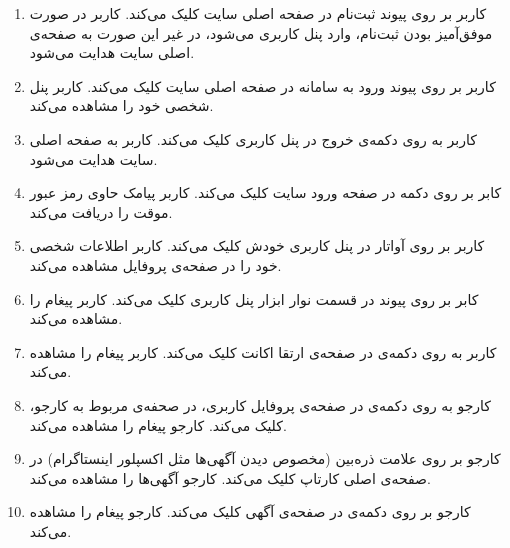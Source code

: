 \begin{enumerate}
	\item[]  			
	
	\tuc				
	{کاربر بر روی پیوند ثبت‌نام در صفحه اصلی سایت کلیک می‌کند.}				
	{کاربر در صورت موفق‌آمیز بودن ثبت‌نام، وارد پنل کاربری می‌شود، در غیر این صورت به صفحه‌ی اصلی سایت هدایت می‌شود.}
	
	\item[]  			
	\tuc				
	{کاربر بر روی پیوند ورود به سامانه در صفحه اصلی سایت کلیک می‌کند.}				
	{کاربر پنل شخصی خود را مشاهده می‌کند.}
	
	\item[] 
	\tuc				
	{کاربر به روی دکمه‌ی خروج در پنل کاربری کلیک می‌کند.}				
	{کاربر به صفحه اصلی سایت هدایت می‌شود.}
	
	\item[] 
	\tuc				
	{کابر بر روی دکمه  در صفحه ورود سایت کلیک می‌کند.}				
	{کاربر پیامک حاوی رمز عبور موقت را دریافت می‌کند.}
	
	\item[] 
	\tuc				
	{کاربر بر روی آواتار در پنل کاربری خودش کلیک می‌کند.}				
	{کاربر اطلاعات شخصی خود را در صفحه‌ی پروفایل مشاهده می‌کند.}
	
	\item[] 
	\tuc				
	{کابر بر روی پیوند  در قسمت نوار ابزار پنل کاربری کلیک می‌کند.}	
	{کاربر پیغام  را مشاهده می‌کند.}
	
	\item[] 
	\tuc				
	{کاربر به روی دکمه‌ی  در صفحه‌ی ارتقا اکانت کلیک می‌کند.}
	{کاربر پیغام  را مشاهده می‌کند.}
	
	\item[] 
	\tuc				
	{کارجو به روی دکمه‌ی  در صفحه‌ی پروفایل کاربری، در صحفه‌ی مربوط به کارجو، کلیک می‌کند.}
	{کارجو پیغام  را مشاهده می‌کند.}
	
	\item[] 
	\tuc				
	{کارجو بر روی علامت ذره‌بین (مخصوص دیدن آگهی‌ها مثل اکسپلور اینستاگرام) در صفحه‌ی اصلی کارتاپ کلیک می‌کند.}
	{کارجو آگهی‌ها را مشاهده می‌کند.}
	
	\item[] 
	\tuc				
	{کارجو بر روی دکمه‌ی  در صفحه‌ی آگهی کلیک می‌کند.}				
	{کارجو پیغام  را مشاهده می‌کند.}
	

\end{enumerate}
